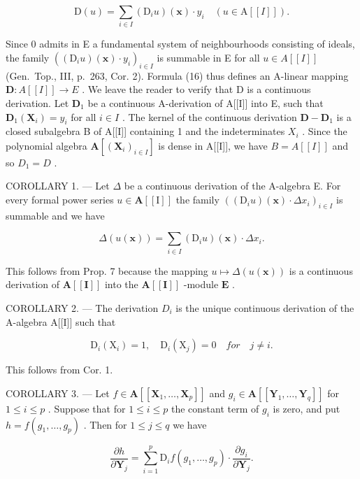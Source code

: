 \[
\mathrm{D} (u) = \sum_ {i \in I} (\mathrm{D} _ {i} u) (\mathbf {x}) \cdot y _ {i} \quad (u \in \mathrm{A} [ [ I ] ])  .\tag{16}
\]

Since 0 admits in E a fundamental system of neighbourhoods consisting of ideals, the family \(((\mathrm{D}_i u)(\mathbf{x}) \cdot y_i)_{i \in I}\) is summable in E for all \(u \in A[[I]]\) (Gen.~Top., III, p.~263, Cor. 2). Formula (16) thus defines an A-linear mapping \(\mathbf{D}: A[[I]] \to E\) . We leave the reader to verify that D is a continuous derivation. Let \(\mathbf{D}_1\) be a continuous A-derivation of A{[}{[}I{]}{]} into E, such that \(\mathbf{D}_1(\mathbf{X}_i) = y_i\) for all \(i \in I\) . The kernel of the continuous derivation \(\mathbf{D} - \mathbf{D}_1\) is a closed subalgebra B of A{[}{[}I{]}{]} containing 1 and the indeterminates \(X_{i}\) . Since the polynomial algebra \(\mathbf{A}[(\mathbf{X}_{i})_{i\in I}]\) is dense in A{[}{[}I{]}{]}, we have \(B = A[[I]]\) and so \(D_{1} = D\) .

COROLLARY 1. --- Let \(\Delta\) be a continuous derivation of the A-algebra E. For every formal power series \(u \in \mathbf{A}[[\mathrm{I}]]\) the family \(((\mathrm{D}_i u)(\mathbf{x}) \cdot \Delta x_i)_{i \in I}\) is summable and we have

\[
\Delta (u (\mathbf {x})) = \sum_ {i \in I} \left(\mathrm{D} _ {i} u\right) (\mathbf {x}) \cdot \Delta x _ {i}.\tag{17}
\]

This follows from Prop. 7 because the mapping \(u \mapsto \Delta(u(\mathbf{x}))\) is a continuous derivation of \(\mathbf{A}[[\mathbf{I}]]\) into the \(\mathbf{A}[[\mathbf{I}]]\) -module \(\mathbf{E}\) .

COROLLARY 2. --- The derivation \(D_{i}\) is the unique continuous derivation of the A-algebra A{[}{[}I{]}{]} such that

\[
\mathrm{D} _ {i} (\mathrm{X} _ {i}) = 1, \quad \mathrm{D} _ {i} (\mathrm{X} _ {j}) = 0 \quad f o r \quad j \neq i.\tag{18}
\]

This follows from Cor. 1.

COROLLARY 3. --- Let \(f \in \mathbf{A}[[\mathbf{X}_1, \ldots, \mathbf{X}_p]]\) and \(g_i \in \mathbf{A}[[\mathbf{Y}_1, \ldots, \mathbf{Y}_q]]\) for \(1 \leqslant i \leqslant p\) . Suppose that for \(1 \leqslant i \leqslant p\) the constant term of \(g_i\) is zero, and put \(h = f(g_1, \ldots, g_p)\) . Then for \(1 \leqslant j \leqslant q\) we have

\[
\frac {\partial h}{\partial \mathbf {Y} _ {j}} = \sum_ {i = 1} ^ {p} \mathrm{D} _ {i} f (g _ {1}, \dots , g _ {p}) \cdot \frac {\partial g _ {i}}{\partial \mathbf {Y} _ {j}}.\tag{19}
\]

